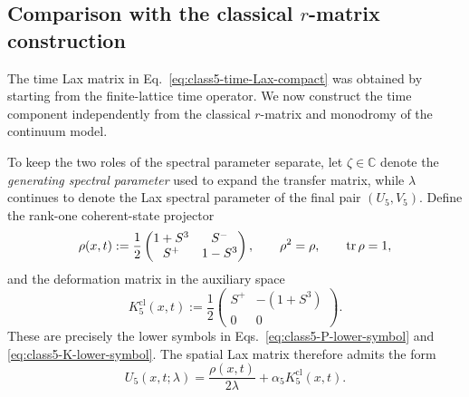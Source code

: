 \subsection{Comparison with the classical \texorpdfstring{$r$}{r}-matrix construction}
\label{sec:class5-rmatrix-comparison}

The time Lax matrix in Eq.~\eqref{eq:class5-time-Lax-compact} was obtained by
starting from the finite-lattice time operator.  We now construct the time
component independently from the classical $r$-matrix and monodromy of the
continuum model.

To keep the two roles of the spectral parameter separate, let
$\zeta\in\mathbb C$ denote the \emph{generating spectral parameter} used to
expand the transfer matrix, while $\lambda$ continues to denote the Lax
spectral parameter of the final pair $(U_5,V_5)$.  Define the rank-one
coherent-state projector
\begin{equation}
\rho(x,t)
:=
\frac12
\begin{pmatrix}
1+S^3&S^-\\
S^+&1-S^3
\end{pmatrix},
\qquad
\rho^2=\rho,
\qquad
\operatorname{tr}\rho=1,
\label{eq:class5-rho-definition}
\end{equation}
and the deformation matrix in the auxiliary space
\begin{equation}
K^{\mathrm{cl}}_5(x,t)
:=
\frac12
\begin{pmatrix}
S^+&-(1+S^3)\\
0&0
\end{pmatrix}.
\label{eq:class5-Kaux-definition}
\end{equation}
These are precisely the lower symbols in
Eqs.~\eqref{eq:class5-P-lower-symbol} and
\eqref{eq:class5-K-lower-symbol}.  The spatial Lax matrix therefore admits the
form
\begin{equation}
U_5(x,t;\lambda)
=
\frac{\rho(x,t)}{2\lambda}
+\alpha_5 K^{\mathrm{cl}}_5(x,t).
\label{eq:class5-U-rho-K}
\end{equation}


